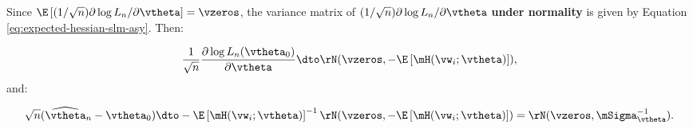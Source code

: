 \begin{subappendices}
\begin{enumerate}
Since $\E\left[(1 / \sqrt{n}) \partial \log L_n /\partial \vtheta\right]  = \vzeros$,  the variance matrix of $(1 / \sqrt{n}) \partial \log L_n /\partial \vtheta$ \textbf{under normality} is given by Equation \eqref{eq:expected-hessian-slm-asy}. Then:


\begin{equation}
 \frac{1}{\sqrt{n}}\frac{\partial \log L_n(\vtheta_0)}{\partial \vtheta} \dto \rN(\vzeros, -\E\left[\mH(\vw_i;\vtheta)\right]), 
\end{equation}
%
and:

\begin{equation*}
\sqrt{n}(\widehat{\vtheta}_n - \vtheta_0)\dto -\E\left[\mH(\vw_i;\vtheta)\right]^{-1}\rN(\vzeros, -\E\left[\mH(\vw_i;\vtheta)\right]) = \rN(\vzeros, \mSigma_{\vtheta}^{-1}).
\end{equation*}

\end{enumerate}

\end{subappendices}


